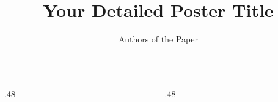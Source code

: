 \documentclass[final,a5paper]{beamer}
\title{Your Detailed Poster Title}
\author{Authors of the Paper}
\institute{Your Institution}
\begin{document}
\begin{frame}[t]
\begin{columns}[t]
\begin{column}{.48\linewidth}


\end{column}
\begin{column}{.48\linewidth}


\end{column}
\end{columns}
\end{frame}
\end{document}
